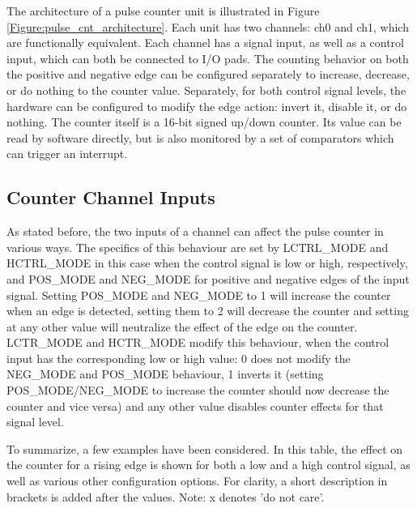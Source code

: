 \documentclass[main\_\_EN.tex]{subfiles}
\begin{document}
The architecture of a pulse counter unit is illustrated in Figure \ref{Figure:pulse_cnt_architecture}. Each unit has two channels: ch0 and ch1, which are functionally equivalent. Each channel has a signal input, as well as a control input, which can both be connected to I/O pads. The counting behavior on both the positive and negative edge can be configured separately to increase, decrease, or do nothing to the counter value. Separately, for both control signal levels, the hardware can be configured to modify the edge action: invert it, disable it, or do nothing. The counter itself is a 16-bit signed up/down counter. Its value can be read by software directly, but is also monitored by a set of comparators which can trigger an interrupt.

\subsection{Counter Channel Inputs}
As stated before, the two inputs of a channel can affect the pulse counter in various ways. The specifics of this behaviour are set by LCTRL\_MODE and HCTRL\_MODE in this case when the control signal is low or high, respectively, and POS\_MODE and NEG\_MODE for positive and negative edges of the input signal. Setting POS\_MODE and NEG\_MODE to 1 will increase the counter when an edge is detected, setting them to 2 will decrease the counter and setting at any other value will neutralize the effect of the edge on the counter. LCTR\_MODE and HCTR\_MODE modify this behaviour, when the control input has the corresponding low or high value: 0 does not modify the NEG\_MODE and POS\_MODE behaviour, 1 inverts it (setting POS\_MODE/NEG\_MODE to increase the counter should now decrease the counter and vice versa) and any other value disables counter effects for that signal level.

To summarize, a few examples have been considered. In this table, the effect on the counter for a rising edge is shown for both a low and a high control signal, as well as various other configuration options. For clarity, a short description in brackets is added after the values. Note: x denotes 'do not care'.
\end{document}
